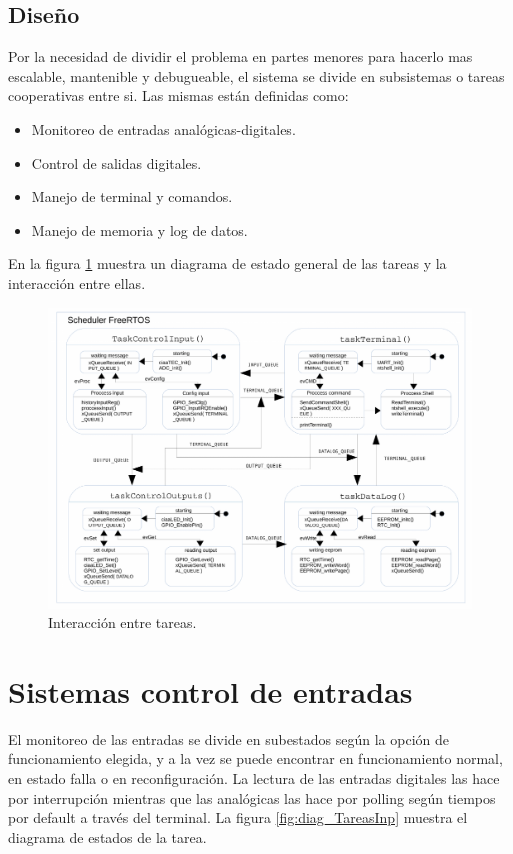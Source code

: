 \subsection{ Diseño }

Por la necesidad de dividir el problema en partes menores para hacerlo mas escalable, mantenible y debugueable, el sistema se divide en subsistemas o tareas cooperativas entre si. Las mismas están definidas como:
\begin{itemize}
	\item Monitoreo de entradas analógicas-digitales.
	\item Control de salidas digitales.
	\item Manejo de terminal y comandos.
	\item Manejo de memoria y log de datos.
\end{itemize}

En la figura \ref{fig:diag_Tareas} muestra un diagrama de estado general de las tareas y la interacción entre ellas.
\begin{figure}[h!]
	\centering
	\includegraphics[width=1.2\textwidth]{Figures/Cap_3/diagrama_tareas}
	\caption{ Interacción entre tareas. }
	\label{fig:diag_Tareas}
\end{figure}

\section{ Sistemas control de entradas }
El monitoreo de las entradas se divide en subestados según la opción de funcionamiento elegida, y a la vez se puede encontrar en funcionamiento normal, en estado falla o en reconfiguración. 
La lectura de las entradas digitales las hace por interrupción mientras que las analógicas las hace por polling según tiempos por default a través del terminal. La figura \ref{fig:diag_TareasInp} muestra el diagrama de estados de la tarea.
 
